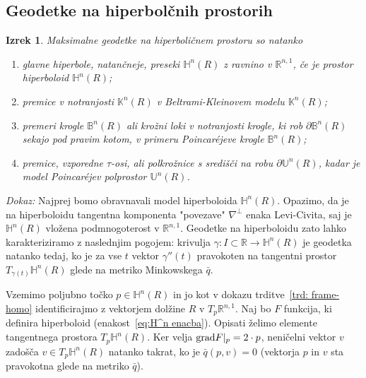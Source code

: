 \documentclass[a4paper]{article}
\newtheorem{izrek}{Izrek}
\begin{document}
\subsection{Geodetke na hiperbolčnih prostorih}

\begin{izrek}
Maksimalne geodetke na hiperboličnem prostoru so natanko
\begin{enumerate}
\item glavne hiperbole, natančneje, preseki $\mathbb{H}^{n}(R)$ z ravnino v $\mathbb{R}^{n,1}$, če je prostor \textup{hiperboloid} $\mathbb{H}^{n}(R)$;
%
\item premice v notranjosti $\mathbb{K}^{n}(R)$ v \textup{Beltrami-Kleinovem modelu} $\mathbb{K}^{n}(R)$;
%
\item premeri krogle $\mathbb{B}^{n}(R)$ ali krožni loki v notranjosti krogle, ki rob $\partial\mathbb{B}^{n}(R)$ sekajo pod pravim kotom, v primeru \textup{Poincar\'ejeve krogle} $\mathbb{B}^{n}(R)$;
%
\item premice, vzporedne $\tau$-osi, ali polkrožnice s središči na robu $\partial\mathbb{U}^{n}(R)$, kadar je model \textup{Poincar\'ejev polprostor} $\mathbb{U}^{n}(R)$.
\end{enumerate}
\end{izrek}

\noindent
{\em Dokaz:\/}
Najprej bomo obravnavali model hiperboloida $\mathbb{H}^{n}(R)$.
Opazimo, da je na hiperboloidu tangentna komponenta "povezave" $\nabla^{\perp}$ enaka Levi-Civita, saj je $\mathbb{H}^{n}(R)$ vložena podmnogoterost v $\mathbb{R}^{n,1}$.
Geodetke na hiperboloidu zato lahko karakteriziramo z naslednjim pogojem: krivulja $\gamma \colon I \subset \mathbb{R} \to \mathbb{H}^{n}(R)$ je geodetka natanko tedaj, ko je za vse $t$ vektor $\gamma''(t)$ pravokoten na tangentni prostor $T_{\gamma(t)}\mathbb{H}^{n}(R)$ glede na metriko Minkowskega $\bar{q}$.

Vzemimo poljubno točko $p \in \mathbb{H}^{n}(R)$ in jo kot v dokazu trditve~\ref{trd: frame-homo} identificirajmo z vektorjem dolžine $R$ v $T_{p}\mathbb{R}^{n,1}$. Naj bo $F$ funkcija, ki definira hiperboloid (enakost~\ref{eq:H^n enacba}).
Opisati želimo elemente tangentnega prostora $T_{p}\mathbb{H}^{n}(R)$. Ker velja $\textup{grad}F|_{p}=2\cdot p$, neničelni vektor $v$ zadošča $v \in T_{p}\mathbb{H}^{n}(R)$ natanko takrat, ko je $\bar{q}(p,v)=0$ (vektorja $p$ in $v$ sta pravokotna glede na metriko $\bar{q}$).
\end{document}
